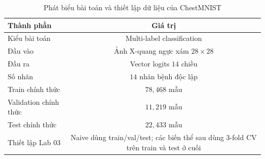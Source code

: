 \begin{table}[H]
\centering
\caption{Phát biểu bài toán và thiết lập dữ liệu của ChestMNIST}
\label{tab:chestmnist-problem-setup}
\begin{tabular}{l c}
\toprule
Thành phần & Giá trị \\
\midrule
Kiểu bài toán & Multi-label classification \\
Đầu vào & Ảnh X-quang ngực xám $28 \times 28$ \\
Đầu ra & Vector logits $14$ chiều \\
Số nhãn & $14$ nhãn bệnh độc lập \\
Train chính thức & $78{,}468$ mẫu \\
Validation chính thức & $11{,}219$ mẫu \\
Test chính thức & $22{,}433$ mẫu \\
Thiết lập Lab 03 & Naive dùng train/val/test; các biến thể sau dùng 3-fold CV trên train và test ở cuối \\
\bottomrule
\end{tabular}
\end{table}
